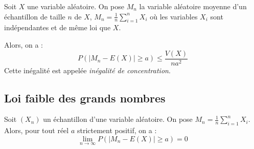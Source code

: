 \begin{theorem}
    Soit \(X\) une variable aléatoire. On pose \(M_{n}\) la variable aléatoire moyenne d'un échantillon de taille \(n\) de \(X\), \(M_{n} = \frac{1}{n} \sum_{i=1}^{n}X_{i}\) où les variables \(X_{i}\) sont indépendantes et de même loi que \(X\).\par
    Alors, on a : 
    \[
        P(\lvert M_{n} - E(X) \rvert \geq a ) \leq \frac{V(X)}{na^{2}}
    \]   
    Cette inégalité est appelée \textit{inégalité de concentration}.
\end{theorem} 

\newpage
\subsection{Loi faible des grands nombres}

\begin{theorem}
    Soit \((X_{n})\) un échantillon d'une variable aléatoire. On pose \(M_{n} = \frac{1}{n} \sum_{i=1}^{n} X_{i}\). Alors, pour tout réel \(a\) strictement positif, on a : 
    \[
        \lim_{n \to \infty}P(\lvert M_{n} - E(X) \rvert \geq a ) = 0
    \]  
\end{theorem}

